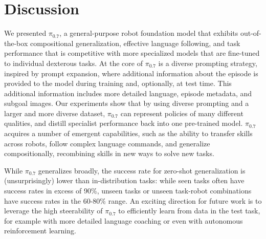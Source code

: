 \documentclass[conference]{IEEEtran}
\def \MethodName {$\pi_{0.7}$}
\begin{document}
\section{Discussion}

We presented \MethodName{}, a general-purpose robot foundation model that exhibits out-of-the-box compositional generalization, effective language following, and task performance that is competitive with more specialized models that are fine-tuned to individual dexterous tasks. At the core of \MethodName{} is a diverse prompting strategy, inspired by prompt expansion, where additional information about the episode is provided to the model during training and, optionally, at test time. This additional information includes more detailed language, episode metadata, and subgoal images. Our experiments show that by using diverse prompting and a larger and more diverse dataset, \MethodName{} can represent policies of many different qualities, and distill specialist performance back into one pre-trained model. \MethodName{}  acquires a number of emergent capabilities, such as the ability to transfer skills across robots, follow complex language commands, and generalize compositionally, recombining skills in new ways to solve new tasks.

While \MethodName{} generalizes broadly, the success rate for zero-shot generalization is (unsurprisingly) lower than in-distribution tasks: while seen tasks often have success rates in excess of 90\%, unseen tasks or unseen task-robot combinations have success rates in the 60-80\% range. An exciting direction for future work is to leverage the high steerability of \MethodName{} to efficiently learn from data in the test task, for example with more detailed language coaching or even with autonomous reinforcement learning.
\end{document}

